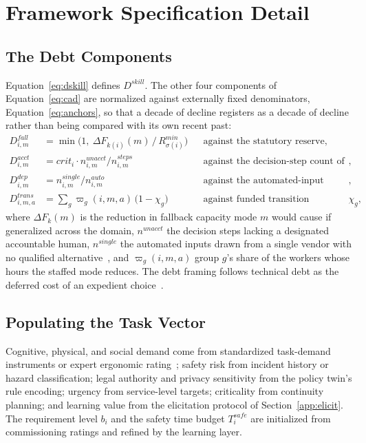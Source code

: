 \documentclass[utf8]{frontiers_suppmat}
\begin{document}
\section{Framework Specification Detail}
\label{app:framework}

\subsection{The Debt Components}
\label{app:framework-dterms}

Equation~\eqref{eq:dskill} defines $D^{skill}$. The other four components of Equation~\eqref{eq:cad} are normalized against externally fixed denominators, Equation~\eqref{eq:anchors}, so that a decade of decline registers as a decade of decline rather than being compared with its own recent past:
\begin{equation}
	\begin{aligned}
		D^{fall}_{i,m} &= \min\!\Big(1,\ \Delta F_{k(i)}(m)\,/\,R^{min}_{\sigma(i)}\Big) &&\text{against the statutory reserve},\\
		D^{acct}_{i,m} &= crit_i \cdot n^{unacct}_{i,m}/n^{steps}_{i,m} &&\text{against the decision-step count of the task},\\
		D^{dep}_{i,m} &= n^{single}_{i,m}/n^{auto}_{i,m} &&\text{against the automated-input count of the mode},\\
		D^{trans}_{i,m,a} &= \textstyle\sum_{g}\varpi_{g}(i,m,a)\,\bigl(1-\chi_g\bigr) &&\text{against funded transition coverage } \chi_g,
	\end{aligned}
	\label{eq:anchors}
\end{equation}
where $\Delta F_k(m)$ is the reduction in fallback capacity mode $m$ would cause if generalized across the domain, $n^{unacct}$ the decision steps lacking a designated accountable human, $n^{single}$ the automated inputs drawn from a single vendor with no qualified alternative~\citep{Sculley2015}, and $\varpi_g(i,m,a)$ group $g$'s share of the workers whose hours the staffed mode reduces. The debt framing follows technical debt as the deferred cost of an expedient choice~\citep{Cunningham1992,Sculley2015}.

\subsection{Populating the Task Vector}
\label{app:framework-task}

Cognitive, physical, and social demand come from standardized task-demand instruments or expert ergonomic rating~\citep{Makrini2019,Merlo2023}; safety risk from incident history or hazard classification; legal authority and privacy sensitivity from the policy twin's rule encoding; urgency from service-level targets; criticality from continuity planning; and learning value from the elicitation protocol of Section~\ref{app:elicit}. The requirement level $b_i$ and the safety time budget $T^{safe}_i$ are initialized from commissioning ratings and refined by the learning layer.
\end{document}
